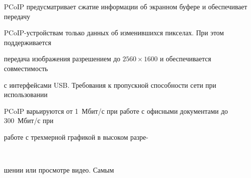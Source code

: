 PCoIP преду\-смат\-ри\-ва\-ет сжатие информации об экранном буфере и обеспечивает передачу 


PCoIP-устройствам только данных об изменившихся пикселах. При этом поддерживается 


передача изображения разрешением до $2560\times1600$ и обеспечивается совместимость 


с интерфейсами USB. Требования к пропускной способности сети при использовании 


PCoIP варьируются от 1~Мбит/с при работе с офисными документами до 300~Мбит/с при 


работе с трехмерной графикой в высоком разре-\linebreak\vspace*{-12pt}





\pagebreak





\





\vspace*{-12pt}













\noindent


шении или просмотре видео. Самым 


